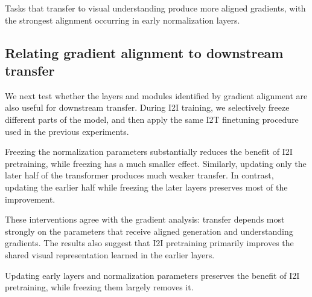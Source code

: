 \begin{findingbox}
Tasks that transfer to visual understanding produce more aligned gradients, with the strongest alignment occurring in early normalization layers.
\end{findingbox}

\subsection{Relating gradient alignment to downstream transfer}
We next test whether the layers and modules identified by gradient alignment are also useful for downstream transfer.
During I2I training, we selectively freeze different parts of the model, and then apply the same I2T finetuning procedure used in the previous experiments.

Freezing the normalization parameters substantially reduces the benefit of I2I pretraining, while freezing  has a much smaller effect.
Similarly, updating only the later half of the transformer produces much weaker transfer. In contrast, updating the earlier half while freezing the later layers preserves most of the improvement.

These interventions agree with the gradient analysis: transfer depends most strongly on the parameters that receive aligned generation and understanding gradients.
The results also suggest that I2I pretraining primarily improves the shared visual representation learned in the earlier layers.
\begin{findingbox}
Updating early layers and normalization parameters preserves the benefit of I2I pretraining, while freezing them largely removes it.
\end{findingbox}

